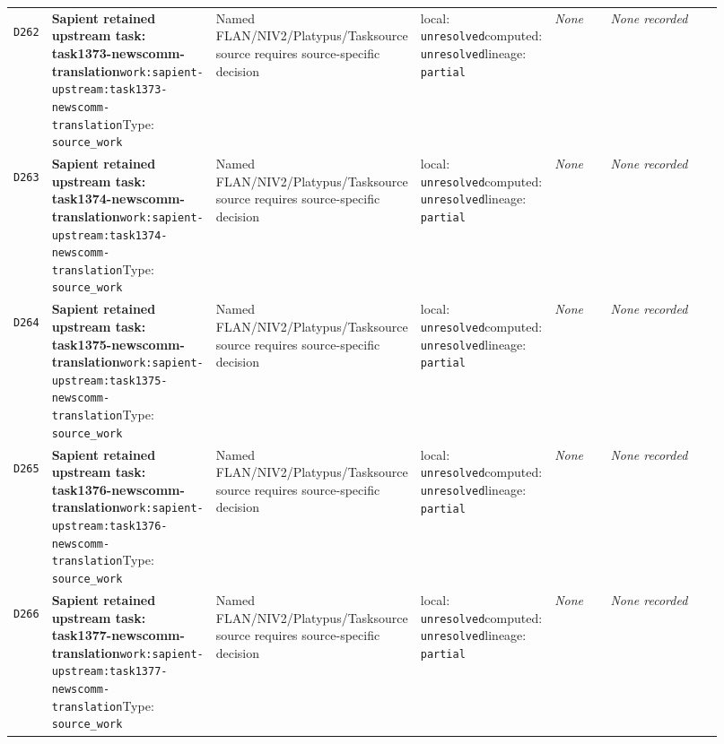 \documentclass[9pt,a4paper]{article}
\newcommand{\depid}[1]{\hypertarget{dep:#1}{\texttt{#1}}}
\begin{document}
\begin{landscape}
\begin{longtable}{@{}L{0.035\linewidth}L{0.185\linewidth}L{0.27\linewidth}L{0.09\linewidth}L{0.10\linewidth}L{0.24\linewidth}@{}}
\depid{D262} & \textbf{Sapient retained upstream task: task1373-newscomm-translation}\newline \nolinkurl{work:sapient-upstream:task1373-newscomm-translation}\newline Type: \texttt{source\_work} & Named FLAN/NIV2/Platypus/Tasksource source requires source-specific decision & local: \texttt{unresolved}\newline computed: \texttt{unresolved}\newline lineage: \texttt{partial} & \textit{None} & \textit{None recorded} \\
\depid{D263} & \textbf{Sapient retained upstream task: task1374-newscomm-translation}\newline \nolinkurl{work:sapient-upstream:task1374-newscomm-translation}\newline Type: \texttt{source\_work} & Named FLAN/NIV2/Platypus/Tasksource source requires source-specific decision & local: \texttt{unresolved}\newline computed: \texttt{unresolved}\newline lineage: \texttt{partial} & \textit{None} & \textit{None recorded} \\
\depid{D264} & \textbf{Sapient retained upstream task: task1375-newscomm-translation}\newline \nolinkurl{work:sapient-upstream:task1375-newscomm-translation}\newline Type: \texttt{source\_work} & Named FLAN/NIV2/Platypus/Tasksource source requires source-specific decision & local: \texttt{unresolved}\newline computed: \texttt{unresolved}\newline lineage: \texttt{partial} & \textit{None} & \textit{None recorded} \\
\depid{D265} & \textbf{Sapient retained upstream task: task1376-newscomm-translation}\newline \nolinkurl{work:sapient-upstream:task1376-newscomm-translation}\newline Type: \texttt{source\_work} & Named FLAN/NIV2/Platypus/Tasksource source requires source-specific decision & local: \texttt{unresolved}\newline computed: \texttt{unresolved}\newline lineage: \texttt{partial} & \textit{None} & \textit{None recorded} \\
\depid{D266} & \textbf{Sapient retained upstream task: task1377-newscomm-translation}\newline \nolinkurl{work:sapient-upstream:task1377-newscomm-translation}\newline Type: \texttt{source\_work} & Named FLAN/NIV2/Platypus/Tasksource source requires source-specific decision & local: \texttt{unresolved}\newline computed: \texttt{unresolved}\newline lineage: \texttt{partial} & \textit{None} & \textit{None recorded} \\

\end{longtable}
\end{landscape}
\end{document}
